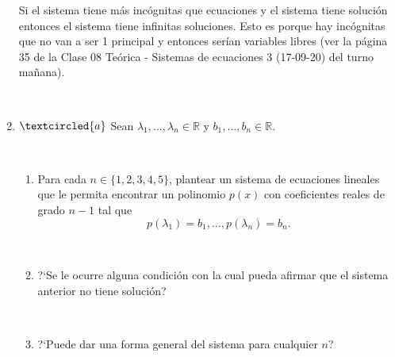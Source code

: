 \documentclass[a4paper,12pt,twoside,spanish,reqno]{amsbook}
\numberwithin{equation}{section}
\newcommand{\R}{\mathbb R}
\begin{document}
\begin{enumerate}
Si el sistema tiene m\'as inc\'ognitas que ecuaciones y el sistema tiene soluci\'on entonces el sistema tiene infinitas soluciones. Esto es porque hay inc\'ognitas que no van a ser 1 principal y entonces ser\'ian variables libres (ver la p\'agina 35 de la Clase 08 Teórica - Sistemas de ecuaciones 3 (17-09-20) del turno ma\~nana).

\

\item\label{polinomios} $\textcircled{a}$ Sean $\lambda_1, ..., \lambda_n\in\R$ y $b_1, ..., b_n\in\R$.

\

\begin{enumerate}
 \item Para cada $n\in\{1,2,3,4,5\}$, plantear un sistema de ecuaciones lineales que le permita encontrar un polinomio $p(x)$ con coeficientes reales de grado $n-1$ tal que
 $$
 p(\lambda_1)=b_1, \dots, p(\lambda_n)=b_n.
 $$

 \

\item ?`Se le ocurre alguna condición con la cual pueda afirmar que el sistema anterior no tiene solución?

\

\item  ?`Puede dar una forma general del sistema para cualquier $n$?

\end{enumerate}



\end{enumerate}
\end{document}
